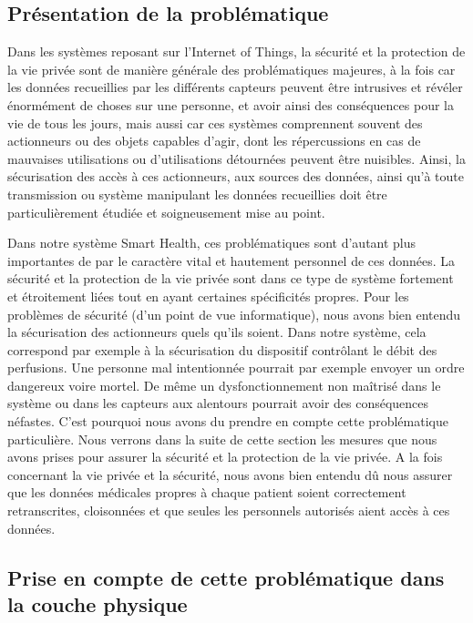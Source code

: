 \subsection{Présentation de la problématique}

Dans les systèmes reposant sur l’Internet of Things, la sécurité et la protection de la vie privée sont de manière générale des problématiques majeures, à la fois car les données recueillies par les différents capteurs peuvent être intrusives et révéler énormément de choses sur une personne, et avoir ainsi des conséquences pour la vie de tous les jours, mais aussi car ces systèmes comprennent souvent des actionneurs ou des objets capables d’agir, dont les répercussions en cas de mauvaises utilisations ou d’utilisations détournées peuvent être nuisibles. Ainsi, la sécurisation des accès à ces actionneurs, aux sources des données, ainsi qu’à toute transmission ou système manipulant les données recueillies doit être particulièrement étudiée et soigneusement mise au point.

Dans notre système Smart Health, ces problématiques sont d’autant plus importantes de par le caractère vital et hautement personnel de ces données. La sécurité et la protection de la vie privée sont dans ce type de système fortement et étroitement liées tout en ayant certaines spécificités propres. Pour les problèmes de sécurité (d’un point de vue informatique), nous avons bien entendu la sécurisation des actionneurs quels qu’ils soient. Dans notre système, cela correspond par exemple à la sécurisation du dispositif contrôlant le débit des perfusions. Une personne mal intentionnée pourrait par exemple envoyer un ordre dangereux voire mortel. De même un dysfonctionnement non maîtrisé dans le système ou dans les capteurs aux alentours pourrait avoir des conséquences néfastes. C’est pourquoi nous avons du prendre en compte cette problématique particulière. Nous verrons dans la suite de cette section les mesures que nous avons prises pour assurer la sécurité et la protection de la vie privée. A la fois concernant la vie privée et la sécurité, nous avons bien entendu dû nous assurer que les données médicales propres à chaque patient soient correctement retranscrites, cloisonnées et que seules les personnels autorisés aient accès à ces données.

\subsection{Prise en compte de cette problématique dans la couche physique}

